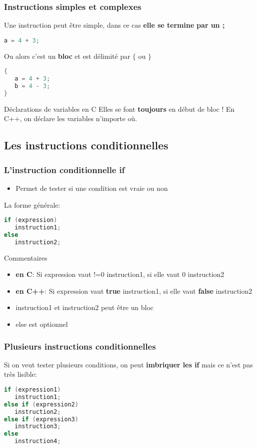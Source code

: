 \documentclass{beamer}
\begin{document}
\begin{frame}[fragile=singleslide,shrink=20]
\frametitle {Instructions simples et complexes}
Une instruction peut être simple, dans ce cas \textbf{elle se termine par un ;}
\begin{lstlisting}[language=c++]
a = 4 + 3;
\end{lstlisting}
Ou alors c'est un \textbf{bloc} et est délimité par $\{$ ou $\}$
\begin{lstlisting}[language=c++]
{
   a = 4 + 3;
   b = 4 - 3;
}
\end{lstlisting}
\begin{block}{Déclarations de variables en C}
Elles se font \textbf{toujours} en début de bloc !
En C++, on déclare les variables n'importe où.
\end{block}
\end{frame}

\subsection{Les instructions conditionnelles}

\begin{frame}[fragile=singleslide,shrink=20]
\frametitle {L'instruction conditionnelle if}

\begin{itemize}
\item{Permet de tester si une condition est vraie ou non}
\end{itemize}


La forme générale:
\begin{lstlisting}[language=c++]
if (expression) 
   instruction1;
else
   instruction2;
\end{lstlisting}

\begin{block}{Commentaires}
\begin{itemize}
\item{\textbf{en C}: Si expression vaut !=0 instruction1, si elle vaut 0 instruction2}
\item{\textbf{en C++}: Si expression vaut \textbf{true} instruction1, si elle vaut \textbf{false} instruction2}
\item{instruction1 et instruction2 peut être un bloc}
\item{else est optionnel}
\end{itemize}
\end{block}
\end{frame}

\begin{frame}[fragile=singleslide,shrink=20]
\frametitle {Plusieurs instructions conditionnelles}

Si on veut tester plusieurs conditions, on peut \textbf{imbriquer les if} mais ce n'est pas très lisible:
\begin{lstlisting}[language=c++]
if (expression1) 
   instruction1;
else if (expression2)
   instruction2;
else if (expression3)
   instruction3;
else
   instruction4;
\end{lstlisting}
\end{frame}
\end{document}
